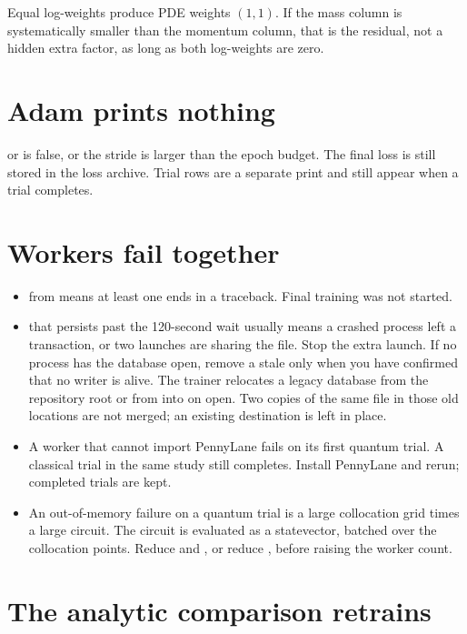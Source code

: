Equal log-weights produce PDE weights \((1,1)\).
If the mass column is systematically smaller than the momentum column, that is the residual, not a hidden extra factor, as long as both log-weights are zero.

\section{Adam prints nothing}

 or  is false, or the stride is larger than the epoch budget.
The final loss is still stored in the loss archive.
Trial rows are a separate print and still appear when a trial completes.

\section{Workers fail together}

\begin{itemize}
\item {} from  means at least one  ends in a traceback.
  Final training was not started.
\item {} that persists past the 120-second wait usually means a crashed process left a transaction, or two launches are sharing the file.
  Stop the extra launch.
  If no process has the database open, remove a stale  only when you have confirmed that no writer is alive.
  The trainer relocates a legacy database from the repository root or from  into  on open.
  Two copies of the same file in those old locations are not merged; an existing destination is left in place.
\item A worker that cannot import PennyLane fails on its first quantum trial.
  A classical trial in the same study still completes.
  Install PennyLane and rerun; completed trials are kept.
\item An out-of-memory failure on a quantum trial is a large collocation grid times a large circuit.
  The circuit is evaluated as a statevector, batched over the collocation points.
  Reduce  and , or reduce , before raising the worker count.
\end{itemize}

\section{The analytic comparison retrains}

